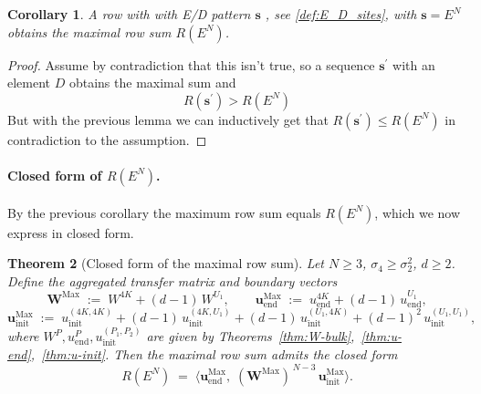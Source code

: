 \documentclass[12pt,a4paper]{article}
\newtheorem{theorem}{Theorem}[section]
\newtheorem{corollary}[theorem]{Corollary}
\begin{document}
\begin{corollary}
\label{cor:max_row_sum}
A row with with E/D pattern $\mathbf{s}$ , see \ref{def:E_D_sites},  with $\mathbf{s}=E^N$ obtains the maximal row sum $R(E^N)$.
\end{corollary}
\begin{proof}
Assume by contradiction that this isn't true, so a sequence $\mathbf{s}^\prime$  with an element $D$  obtains the maximal sum and $$R(\mathbf{s}^\prime)>R(E^N)$$
But with the previous lemma we can inductively get that $R(\mathbf{s}^\prime)\le R(E^N)$ in contradiction to the assumption.
\end{proof}

\paragraph{Closed form of $R(E^N)$.}
By the previous corollary the maximum row sum equals $R(E^N)$, which we now express in closed form.
\begin{theorem}[Closed form of the maximal row sum]\label{thm:R-EN-closed}
Let $N\ge3$, $\sigma_4\ge\sigma_2^2$, $d\ge2$. Define the aggregated transfer matrix and
boundary vectors
\[
\mathbf{W}^{\mathrm{Max}} \;:=\; W^{4K} + (d-1)\,W^{U_1},
\qquad
\mathbf{u}^{\mathrm{Max}}_{\mathrm{end}} \;:=\; u_\mathrm{end}^{4K} + (d-1)\,u_\mathrm{end}^{U_1},
\]
\[
\mathbf{u}^{\mathrm{Max}}_{\mathrm{init}} \;:=\; u_\mathrm{init}^{(4K,4K)} + (d-1)\,u_\mathrm{init}^{(4K,U_1)}
+ (d-1)\,u_\mathrm{init}^{(U_1,4K)} + (d-1)^{2}\,u_\mathrm{init}^{(U_1,U_1)},
\]
where $W^{P},u_\mathrm{end}^{P},u_\mathrm{init}^{(P_1,P_2)}$ are given by
Theorems~\ref{thm:W-bulk},~\ref{thm:u-end},~\ref{thm:u-init}. Then the maximal row sum
admits the closed form
\[
R(E^N) \;=\; \bigl\langle \mathbf{u}^{\mathrm{Max}}_{\mathrm{end}},\; (\mathbf{W}^{\mathrm{Max}})^{\,N-3}\, \mathbf{u}^{\mathrm{Max}}_{\mathrm{init}}\bigr\rangle .
\]
\end{theorem}
\end{document}
